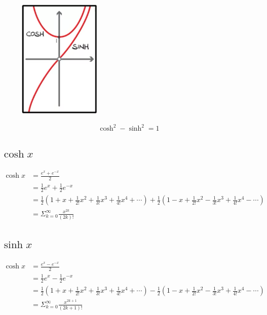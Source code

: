 \documentclass[a4paper,12pt]{article}
\begin{document}
\begin{figure}[htp]
    \centering
    \includegraphics[width=4cm]{hyperbolic_trigs.png}
    \label{fig:hyperbolic_trigs}
\end{figure}

$$\cosh^2 - \sinh^2 = 1$$

\subsection{$\cosh{x}$}

\begin{equation}
\begin{split}
\cosh{x} & = \frac{e^x + e^{-x}}{2} \\
 & = \frac{1}{2}e^x + \frac{1}{2}e^{-x} \\
 & = \frac{1}{2}(1 + x + \frac{1}{2!}x^2 + \frac{1}{3!}x^3 + \frac{1}{4!}x^4 + \cdots) + \frac{1}{2}(1 - x + \frac{1}{2!}x^2 - \frac{1}{3!}x^3 + \frac{1}{4!}x^4 - \cdots) \\
 & = \Sigma_{k=0}^\infty \frac{x^{2k}}{(2k)!}
\end{split}
\end{equation}

\subsection{$\sinh{x}$}

\begin{equation}
\begin{split}
\cosh{x} & = \frac{e^x - e^{-x}}{2} \\
 & = \frac{1}{2}e^x - \frac{1}{2}e^{-x} \\
 & = \frac{1}{2}(1 + x + \frac{1}{2!}x^2 + \frac{1}{3!}x^3 + \frac{1}{4!}x^4 + \cdots) - \frac{1}{2}(1 - x + \frac{1}{2!}x^2 - \frac{1}{3!}x^3 + \frac{1}{4!}x^4 - \cdots) \\
 & = \Sigma_{k=0}^\infty \frac{x^{2k+1}}{(2k+1)!}
\end{split}
\end{equation}
\end{document}
